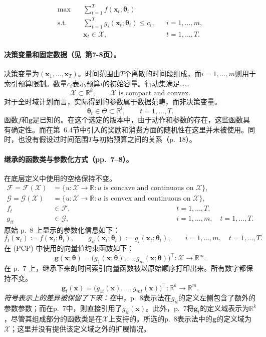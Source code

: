 \documentclass{article}
\begin{document}
\begin{equation}
\begin{aligned}
\max\quad & \sum_{t=1}^{T} f(\boldsymbol{x}_t;\boldsymbol{\theta}_t) \\
\text{s.t.}\quad & \sum_{t=1}^{T} g_i(\boldsymbol{x}_t;\boldsymbol{\theta}_t)\le c_i,
&& i=1,\ldots,m, \\
& \boldsymbol{x}_t\in\mathcal{X},
&& t=1,\ldots,T.
\end{aligned}
\tag{PCP}
\end{equation}

\paragraph{决策变量和固定数据（见~第7-8页）。}
决策变量为$(\boldsymbol{x}_1,\ldots,\boldsymbol{x}_T)$。时间范围由$T$个离散的时间段组成，而$i=1,\ldots,m$则用于索引预算限制。数量$c_i$表示预算$i$的初始容量。行动集满足……
\[
\mathcal{X}\subset\mathbb{R}^{k},\qquad
\mathcal{X}\text{ is compact and convex}.
\]
对于全时域计划而言，实际得到的参数属于数据范畴，而非决策变量。
\[
\boldsymbol{\theta}_t\in\Theta\subset\mathbb{R}^{l},
\qquad t=1,\ldots,T.
\]
函数$f$和$\boldsymbol{g}$是已知的。在这个选定的版本中，由于动作和参数的存在，这些函数具有确定性。而在第~6.4节中引入的奖励和消费方面的随机性在这里并未被使用。同时，也没有假设过时间范围$T$与初始预算之间的关系（p.~18）。

\paragraph{继承的函数类与参数化方式（pp.~7--8）。}
在底层定义中使用的空格保持不变。
\[
\begin{aligned}
\mathcal{F}=\mathcal{F}(\mathcal{X})
&=\{u:\mathcal{X}\to\mathbb{R}:u\text{ is concave and continuous on }\mathcal{X}\},\\
\mathcal{G}=\mathcal{G}(\mathcal{X})
&=\{u:\mathcal{X}\to\mathbb{R}:u\text{ is convex and continuous on }\mathcal{X}\},\\
f_t&\in\mathcal{F}, &&t=1,\ldots,T,\\
g_{it}&\in\mathcal{G}, &&i=1,\ldots,m,\quad t=1,\ldots,T.
\end{aligned}
\]
原始 p.~8 上显示的参数化信息如下：
\[
f_t(\boldsymbol{x}_t):=f(\boldsymbol{x}_t;\boldsymbol{\theta}_t),
\qquad
g_{it}(\boldsymbol{x}_t;\boldsymbol{\theta}_t):=g_i(\boldsymbol{x}_t;\boldsymbol{\theta}_t),
\qquad i=1,\ldots,m,\quad t=1,\ldots,T.
\]
在 (PCP) 中使用的向量值约束函数如下：
\[
\boldsymbol{g}(\boldsymbol{x};\boldsymbol{\theta})
=\bigl(g_1(\boldsymbol{x};\boldsymbol{\theta}),\ldots,
 g_m(\boldsymbol{x};\boldsymbol{\theta})\bigr)^{\top}
:\mathcal{X}\to\mathbb{R}^{m}.
\]
在 p.~7 上，继承下来的时间索引向量函数被以原始顺序打印出来。所有数字都保持不变。
\[
\boldsymbol{g}_t(\boldsymbol{x})
=\bigl(g_{1t}(\boldsymbol{x}),\ldots,g_{mt}(\boldsymbol{x})\bigr)^{\top}
:\mathbb{R}^{k}\to\mathbb{R}^{m}.
\]
\emph{符号表示上的差异被保留了下来：在}中，p.~8表示法在$g_{it}$的定义左侧包含了额外的参数参数；而在p.~7中，则直接引用了$g_{it}(\boldsymbol{x})$。此外，p.~7将$\boldsymbol{g}_t$的定义域表示为$\mathbb{R}^{k}$，尽管其组成部分的函数类是在$\mathcal{X}$上支持的。所选的p.~8表示法中的$\boldsymbol{g}$的定义域为$\mathcal{X}$；这里并没有提供该定义域之外的扩展情况。
\end{document}
